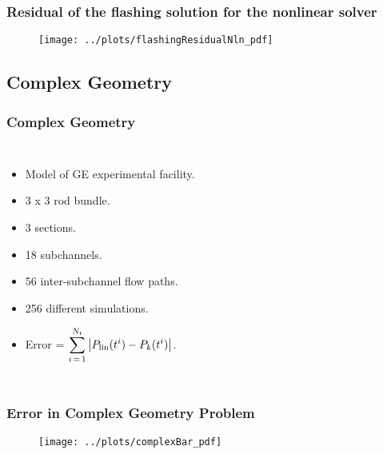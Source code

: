 \documentclass[compress,xcolor=table]{beamer}
\begin{document}
\begin{frame}
\frametitle{Residual of the flashing solution for the nonlinear solver}

\begin{figure}[h!t]
\centering
\texttt{[image: ../plots/flashingResidualNln\_pdf]}
\end{figure}

\end{frame}
\subsection[Complex Geometry]{Complex Geometry}
\begin{frame}
\frametitle{Complex Geometry}
\begin{columns}

\begin{itemize}
\item{Model of GE experimental facility.}
\item{3 x 3 rod bundle.}
\item{3 sections.}
\item{18 subchannels.}
\item{56 inter-subchannel flow paths.}
\item{256 different simulations.}
\item{Error = $\displaystyle \sum_{i\,=\,1}^{N_{t}} \left|P_{\text{lin}}(t^{i}) -P_{k}(t^{i})\right|$.}
\end{itemize}


\begin{figure}[h!t]
\centering
\resizebox{\textwidth}{!}{

}
\end{figure}

\end{columns}
\end{frame}
\begin{frame}
\frametitle{Error in Complex Geometry Problem}

\begin{figure}[h!t]
\centering
\texttt{[image: ../plots/complexBar\_pdf]}
\end{figure}

\end{frame}
\end{document}
